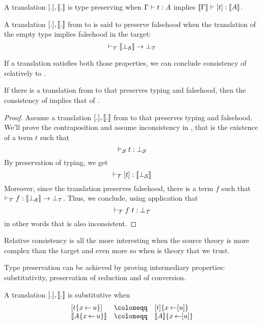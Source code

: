 \begin{definition}
  A translation \([.], \llbracket . \rrbracket\) is type preserving when
  \(\Gamma \vdash t : A\) implies \(\llbracket \Gamma \rrbracket \vdash [t] : \llbracket A \rrbracket\).
\end{definition}

\begin{definition}
  A translation \([.], \llbracket . \rrbracket\) from \cS to \cT is said to preserve
  falsehood when the translation of the empty type implies falsehood in the
  target:
  \[ \vdash_\mathcal{T} \llbracket \bot_\mathcal{S} \rrbracket \to \bot_\mathcal{T} \]
\end{definition}

If a translation satisfies both those properties, we can conclude consistency
of \cS relatively to \cT.

\begin{theorem}
  If there is a translation from \cS to \cT that preserves typing and
  falsehood, then the consistency of \cT implies that of \cS.
\end{theorem}

\begin{proof}
  Assume a translation \([.], \llbracket . \rrbracket\) from \cS to \cT that preserves typing
  and falsehood. We'll prove the contraposition and assume inconsistency in
  \cS, that is the existence of a term \(t\) such that
  \[ \vdash_\mathcal{S} t : \bot_\mathcal{S} \]
  By preservation of typing, we get
  \[ \vdash_\mathcal{T} [t] : \llbracket \bot_\mathcal{S} \rrbracket \]
  Moreover, since the translation preserves falsehood, there is a term \(f\)
  such that \(\vdash_\mathcal{T} f : \llbracket \bot_\mathcal{S} \rrbracket \to \bot_\mathcal{T}\).
  Thus, we conclude, using application that
  \[ \vdash_\mathcal{T} f\ t : \bot_\mathcal{T} \]
  in other words that \cT is also inconsistent.
\end{proof}

Relative consistency is all the more interesting when the source theory is more
complex than the target and even more so when \cT is theory that we trust.

Type preservation can be achieved by proving intermediary properties:
substitutivity, preservation of reduction and of conversion.

\begin{definition}[Substitutivity]
  A translation \([.], \llbracket . \rrbracket\) is substitutive when
  \[
    \begin{array}{lcl}
      [t\{x \sto u\}] &\coloneqq& [t]\{x \sto [u]\} \\
      \transl{A\{x \sto u\}} &\coloneqq& \transl{A}\{x \sto [u]\} \\
    \end{array}
  \]
\end{definition}

